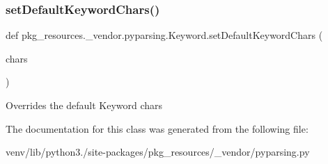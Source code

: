 \subsubsection{\texorpdfstring{set\+Default\+Keyword\+Chars()}{setDefaultKeywordChars()}}
{\footnotesize\ttfamily def pkg\+\_\+resources.\+\_\+vendor.\+pyparsing.\+Keyword.\+set\+Default\+Keyword\+Chars (\begin{DoxyParamCaption}\item[{}]{chars }\end{DoxyParamCaption})\hspace{0.3cm}{\ttfamily [static]}}

\begin{DoxyVerb}Overrides the default Keyword chars
\end{DoxyVerb}
 

The documentation for this class was generated from the following file\+:\begin{DoxyCompactItemize}
\item 
venv/lib/python3./site-\/packages/pkg\+\_\+resources/\+\_\+vendor/pyparsing.\+py\end{DoxyCompactItemize}
